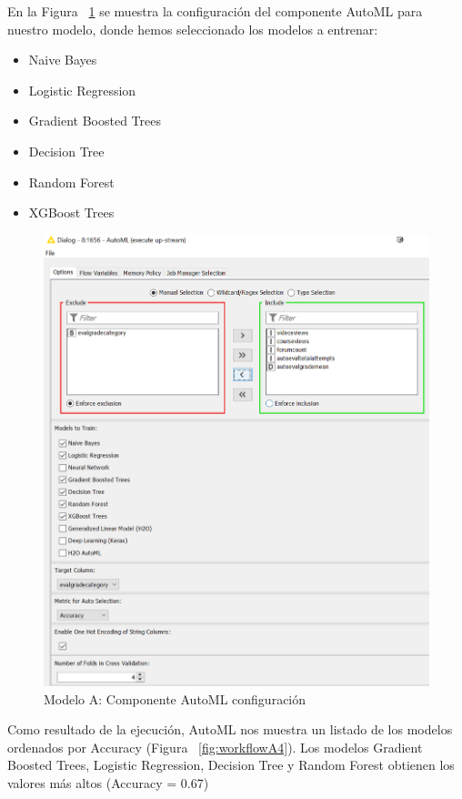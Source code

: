 En la Figura ~\ref{fig:workflowA2} se muestra la configuración del componente AutoML para nuestro modelo, donde hemos seleccionado los 
modelos a entrenar: 

\begin{itemize}
	\item Naive Bayes
	\item Logistic Regression
	\item Gradient Boosted Trees 
	\item Decision Tree 
	\item Random Forest 
	\item XGBoost Trees
\end{itemize}

\begin{figure}[!htb]
	\centering
	\includegraphics[width=1\textwidth]{img/workflowA2.png}
	\caption{Modelo A: Componente AutoML configuración}
	\label{fig:workflowA2}
\end{figure}
\FloatBarrier

Como resultado de la ejecución, AutoML nos muestra un listado de los modelos ordenados por Accuracy (Figura ~\ref{fig:workflowA4}). 
Los modelos Gradient Boosted Trees, Logistic Regression, Decision Tree y Random Forest obtienen los valores más altos (Accuracy = 0.67)

